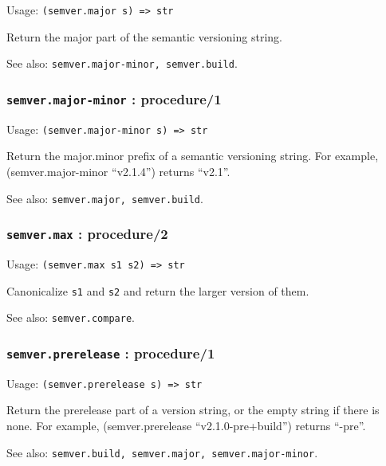 \documentclass[
]{article}
\newcommand{\passthrough}[1]{#1}
\begin{document}
Usage: \passthrough{\lstinline!(semver.major s) => str!}

Return the major part of the semantic versioning string.

See also: \passthrough{\lstinline!semver.major-minor, semver.build!}.

\hypertarget{semver.major-minor-procedure1}{%
\subsubsection{\texorpdfstring{\texttt{semver.major-minor} :
procedure/1}{semver.major-minor : procedure/1}}\label{semver.major-minor-procedure1}}

Usage: \passthrough{\lstinline!(semver.major-minor s) => str!}

Return the major.minor prefix of a semantic versioning string. For
example, (semver.major-minor ``v2.1.4'') returns ``v2.1''.

See also: \passthrough{\lstinline!semver.major, semver.build!}.

\hypertarget{semver.max-procedure2}{%
\subsubsection{\texorpdfstring{\texttt{semver.max} :
procedure/2}{semver.max : procedure/2}}\label{semver.max-procedure2}}

Usage: \passthrough{\lstinline!(semver.max s1 s2) => str!}

Canonicalize \passthrough{\lstinline!s1!} and
\passthrough{\lstinline!s2!} and return the larger version of them.

See also: \passthrough{\lstinline!semver.compare!}.

\hypertarget{semver.prerelease-procedure1}{%
\subsubsection{\texorpdfstring{\texttt{semver.prerelease} :
procedure/1}{semver.prerelease : procedure/1}}\label{semver.prerelease-procedure1}}

Usage: \passthrough{\lstinline!(semver.prerelease s) => str!}

Return the prerelease part of a version string, or the empty string if
there is none. For example, (semver.prerelease ``v2.1.0-pre+build'')
returns ``-pre''.

See also:
\passthrough{\lstinline!semver.build, semver.major, semver.major-minor!}.
\end{document}
